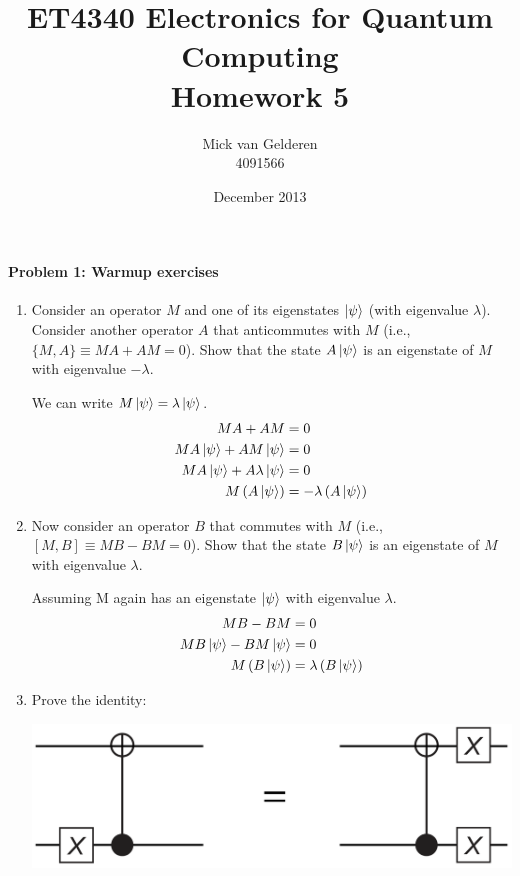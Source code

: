 \documentclass[12pt]{article}
\title{ET4340 Electronics for Quantum Computing\\Homework 5}
\author{
    Mick van Gelderen\\4091566
}
\date{December 2013}
\newenvironment{answer}{\begingroup\setlength{\leftskip}{-\leftmargin}\begin{framed}}{\end{framed}\endgroup}
\begin{document}
\maketitle

\paragraph{Problem 1: Warmup exercises} \hfill

\begin{enumerate}
    \item Consider an operator $M$ and one of its eigenstates $\ket{\psi}$ (with eigenvalue $\lambda$). Consider another operator $A$ that anticommutes with $M$ (i.e., $\{M,A\} \equiv MA + AM = 0$). Show that the state $A\ket{\psi}$ is an eigenstate of $M$ with eigenvalue $-\lambda$.

    \begin{answer}
        We can write $M\ket{\psi} = \lambda\ket{\psi}$.
        \begin{align*}
            MA + AM &= 0 \\
            MA\ket{\psi} + AM\ket{\psi} &= 0 \\
            MA\ket{\psi} + A\lambda\ket{\psi} &= 0 \\
            M\left(A\ket{\psi}\right) &= -\lambda\left(A\ket{\psi}\right)
        \end{align*}
    \end{answer}

    \item Now consider an operator $B$ that commutes with $M$ (i.e., $[M,B] \equiv MB - BM = 0$). Show that the state $B\ket{\psi}$ is an eigenstate of $M$ with eigenvalue $\lambda$.

    \begin{answer}
        Assuming M again has an eigenstate $\ket{\psi}$ with eigenvalue $\lambda$.
        \begin{align*}
            MB - BM &= 0 \\
            MB\ket{\psi} - BM\ket{\psi} &= 0 \\
            M\left(B\ket{\psi}\right) &= \lambda\left(B\ket{\psi}\right)
        \end{align*}
    \end{answer}

    \item Prove the identity:

    \begin{center}\includegraphics[width=.8\textwidth]{problem-1.png}\end{center}


\end{enumerate}
\end{document}
